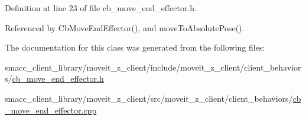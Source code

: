 Definition at line 23 of file cb\+\_\+move\+\_\+end\+\_\+effector.\+h.



Referenced by Cb\+Move\+End\+Effector(), and move\+To\+Absolute\+Pose().



The documentation for this class was generated from the following files\+:\begin{DoxyCompactItemize}
\item 
smacc\+\_\+client\+\_\+library/moveit\+\_\+z\+\_\+client/include/moveit\+\_\+z\+\_\+client/client\+\_\+behaviors/\hyperlink{cb__move__end__effector_8h}{cb\+\_\+move\+\_\+end\+\_\+effector.\+h}\item 
smacc\+\_\+client\+\_\+library/moveit\+\_\+z\+\_\+client/src/moveit\+\_\+z\+\_\+client/client\+\_\+behaviors/\hyperlink{cb__move__end__effector_8cpp}{cb\+\_\+move\+\_\+end\+\_\+effector.\+cpp}\end{DoxyCompactItemize}

